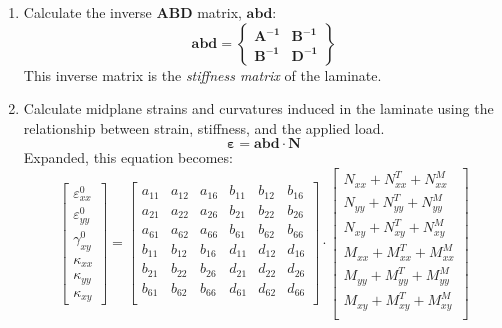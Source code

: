 \documentclass{article}
\begin{document}
\begin{enumerate}
    \item Calculate the inverse $\bm{ABD}$ matrix, $\bm{abd}$:
    \begin{equation}
        \bm{abd} = \left\{ \begin{array}{c|c} \bm{A^{-1}} & \bm{B^{-1}} \\ \hline \bm{B^{-1}} & \bm{D^{-1}} \end{array} \right\}
    \end{equation}
    This inverse matrix is the \emph{stiffness matrix} of the laminate.

    \item Calculate midplane strains and curvatures induced in the laminate using the relationship between strain, stiffness, and the applied load.
    \begin{equation}
        \bm{\varepsilon} = \bm{abd}\cdot\bm{N}
    \end{equation}
    Expanded, this equation becomes:
    $$
        \left[\begin{array}{c} \varepsilon_{xx}^{0} \\ \varepsilon_{yy}^{0} \\ \gamma_{xy}^{0} \\ \hline \kappa_{xx} \\ \kappa_{yy} \\ \kappa_{xy} \end{array}\right] =
        \left[\begin{array}{ccc|ccc} a_{11} & a_{12} & a_{16} & b_{11} & b_{12} & b_{16} \\
                                    a_{21} & a_{22} & a_{26} & b_{21} & b_{22} & b_{26} \\
                                    a_{61} & a_{62} & a_{66} & b_{61} & b_{62} & b_{66} \\
                                    \hline
                                    b_{11} & b_{12} & b_{16} & d_{11} & d_{12} & d_{16} \\
                                    b_{21} & b_{22} & b_{26} & d_{21} & d_{22} & d_{26} \\
                                    b_{61} & b_{62} & b_{66} & d_{61} & d_{62} & d_{66} \\\end{array}\right] \cdot
        \left[\begin{array}{c} N_{xx} + N_{xx}^T + N_{xx}^M \\
                               N_{yy} + N_{yy}^T + N_{yy}^M \\
                               N_{xy} + N_{xy}^T + N_{xy}^M \\
                               \hline
                               M_{xx} + M_{xx}^T + M_{xx}^M \\
                               M_{yy} + M_{yy}^T + M_{yy}^M \\
                               M_{xy} + M_{xy}^T + M_{xy}^M \\
        \end{array}\right]
    $$


\end{enumerate}
\end{document}
